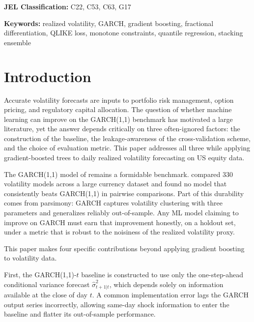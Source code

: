 \documentclass[12pt]{article}
\begin{document}
\begin{titlepage}
\vspace{1cm}

\noindent\textbf{JEL Classification:} C22, C53, C63, G17

\vspace{0.3cm}

\noindent\textbf{Keywords:} realized volatility, GARCH, gradient boosting,
fractional differentiation, QLIKE loss, monotone constraints, quantile
regression, stacking ensemble

\end{titlepage}

\newpage


\section{Introduction}

Accurate volatility forecasts are inputs to portfolio risk management, option
pricing, and regulatory capital allocation.  The question of whether machine
learning can improve on the GARCH(1,1) benchmark has motivated a large
literature, yet the answer depends critically on three often-ignored factors:
the construction of the baseline, the leakage-awareness of the cross-validation
scheme, and the choice of evaluation metric.  This paper addresses all three
while applying gradient-boosted trees to daily realized volatility forecasting
on US equity data.

The GARCH(1,1) model of \citet{Bollerslev1986} remains a formidable benchmark.
\citet{HansenLunde2005} compared 330 volatility models across a large currency
dataset and found no model that consistently beats GARCH(1,1) in pairwise
comparisons.  Part of this durability comes from parsimony: GARCH captures
volatility clustering with three parameters and generalizes reliably
out-of-sample.  Any ML model claiming to improve on GARCH must earn that
improvement honestly, on a holdout set, under a metric that is robust to the
noisiness of the realized volatility proxy.

This paper makes four specific contributions beyond applying gradient boosting
to volatility data.

First, the GARCH(1,1)-$t$ baseline is constructed to use only the
one-step-ahead conditional variance forecast $\hat{\sigma}_{t+1|t}^{2}$,
which depends solely on information available at the close of day $t$.  A
common implementation error lags the GARCH output series incorrectly, allowing
same-day shock information to enter the baseline and flatter its
out-of-sample performance.
\end{document}

